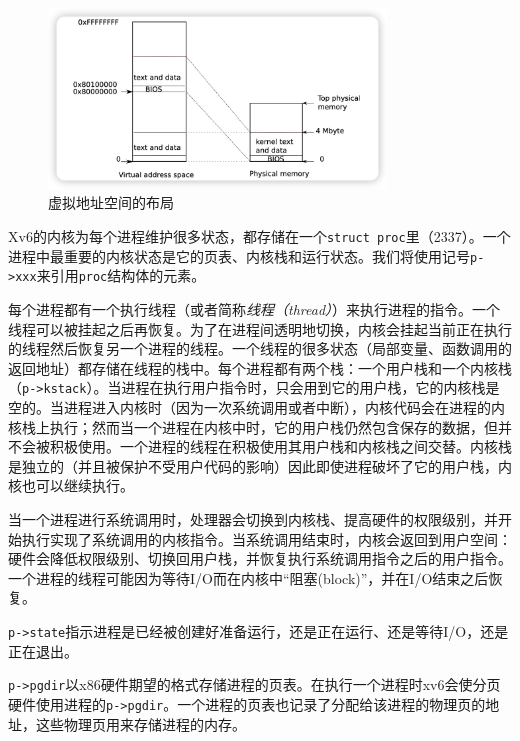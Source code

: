 \begin{figure}[htbp]
    \centering
    \includegraphics[width=0.8\textwidth]{../imgs/f1-3.png}
    \caption{虚拟地址空间的布局}
    \label{f1-3}
\end{figure}

Xv6的内核为每个进程维护很多状态，都存储在一个\texttt{struct proc}里（2337）。一个进程中最重要的内核状态是它的页表、内核栈和运行状态。我们将使用记号\texttt{p->xxx}来引用\texttt{proc}结构体的元素。

每个进程都有一个执行线程（或者简称\emph{线程（thread）}）来执行进程的指令。一个线程可以被挂起之后再恢复。为了在进程间透明地切换，内核会挂起当前正在执行的线程然后恢复另一个进程的线程。一个线程的很多状态（局部变量、函数调用的返回地址）都存储在线程的栈中。每个进程都有两个栈：一个用户栈和一个内核栈（\texttt{p->kstack}）。当进程在执行用户指令时，只会用到它的用户栈，它的内核栈是空的。当进程进入内核时（因为一次系统调用或者中断），内核代码会在进程的内核栈上执行；然而当一个进程在内核中时，它的用户栈仍然包含保存的数据，但并不会被积极使用。一个进程的线程在积极使用其用户栈和内核栈之间交替。内核栈是独立的（并且被保护不受用户代码的影响）因此即使进程破坏了它的用户栈，内核也可以继续执行。

当一个进程进行系统调用时，处理器会切换到内核栈、提高硬件的权限级别，并开始执行实现了系统调用的内核指令。当系统调用结束时，内核会返回到用户空间：硬件会降低权限级别、切换回用户栈，并恢复执行系统调用指令之后的用户指令。一个进程的线程可能因为等待I/O而在内核中“阻塞(block)”，并在I/O结束之后恢复。

\texttt{p->state}指示进程是已经被创建好准备运行，还是正在运行、还是等待I/O，还是正在退出。

\texttt{p->pgdir}以x86硬件期望的格式存储进程的页表。在执行一个进程时xv6会使分页硬件使用进程的\texttt{p->pgdir}。一个进程的页表也记录了分配给该进程的物理页的地址，这些物理页用来存储进程的内存。
